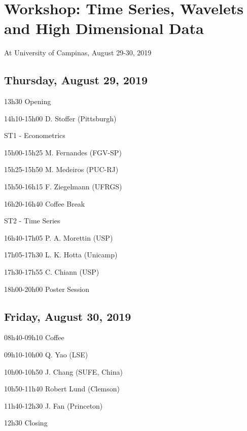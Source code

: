 \documentclass[]{article}
\date{}
\begin{document}
\section{Workshop: Time Series, Wavelets and High Dimensional
Data}\label{workshop-time-series-wavelets-and-high-dimensional-data}

At University of Campinas, August 29-30, 2019

\subsection{Thursday, August 29, 2019}\label{thursday-august-29-2019}

13h30 Opening

14h10-15h00 D. Stoffer (Pittsburgh)

ST1 - Econometrics

15h00-15h25 M. Fernandes (FGV-SP)

15h25-15h50 M. Medeiros (PUC-RJ)

15h50-16h15 F. Ziegelmann (UFRGS)

16h20-16h40 Coffee Break

ST2 - Time Series

16h40-17h05 P. A. Morettin (USP)

17h05-17h30 L. K. Hotta (Unicamp)

17h30-17h55 C. Chiann (USP)

18h00-20h00 Poster Session

\subsection{Friday, August 30, 2019}\label{friday-august-30-2019}

08h40-09h10 Coffee

09h10-10h00 Q. Yao (LSE)

10h00-10h50 J. Chang (SUFE, China)

10h50-11h40 Robert Lund (Clemson)

11h40-12h30 J. Fan (Princeton)

12h30 Closing
\end{document}

